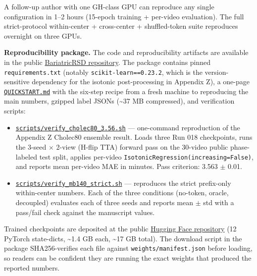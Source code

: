 A follow-up author with one GH-class GPU can reproduce any
single configuration in 1--2 hours (15-epoch training + per-video
evaluation). The full strict-protocol within-center + cross-center +
shuffled-token suite reproduces overnight on three GPUs.

\textbf{Reproducibility package.} The code and reproducibility artifacts
are available in the public
\href{https://github.com/billchenxi/BariatricRSD}{BariatricRSD repository}.
The package contains pinned \texttt{requirements.txt} (notably
\texttt{scikit-learn==0.23.2}, which is the version-sensitive dependency
for the isotonic post-processing in Appendix Z), a one-page
\href{https://github.com/billchenxi/BariatricRSD/blob/master/reproducibility/QUICKSTART.md}{\texttt{QUICKSTART.md}}
with the six-step recipe from a fresh machine to reproducing the main
numbers, gzipped label JSONs (\textasciitilde37 MB compressed), and
verification scripts:

\begin{itemize}
\tightlist
\item
  \href{https://github.com/billchenxi/BariatricRSD/blob/master/reproducibility/scripts/verify_cholec80_3.56.sh}{\texttt{scripts/verify\_cholec80\_3.56.sh}}
  --- one-command reproduction of the Appendix Z Cholec80 ensemble
  result. Loads three Run 018 checkpoints, runs the 3-seed $\times$ 2-view
  (H-flip TTA) forward pass on the 30-video public phase-labeled test
  split, applies per-video
  \texttt{IsotonicRegression(increasing=False)}, and reports mean
  per-video MAE in minutes. Pass criterion: 3.563 $\pm$ 0.01.
\item
  \href{https://github.com/billchenxi/BariatricRSD/blob/master/reproducibility/scripts/verify_mb140_strict.sh}{\texttt{scripts/verify\_mb140\_strict.sh}}
  --- reproduces the strict prefix-only within-center numbers. Each of
  the three conditions (no-token, oracle, decoupled) evaluates each of
  three seeds and reports mean $\pm$ std with a pass/fail check against
  the manuscript values.
\end{itemize}

Trained checkpoints are deposited at the public
\href{https://huggingface.co/billchenxi/surgical-workflow-models}{Hugging Face repository}
(12 PyTorch state-dicts, \textasciitilde1.4 GB each, \textasciitilde17 GB
total). The download script in the package SHA256-verifies each file
against \texttt{weights/manifest.json} before loading, so readers can be
confident they are running the exact weights that produced the reported
numbers.

